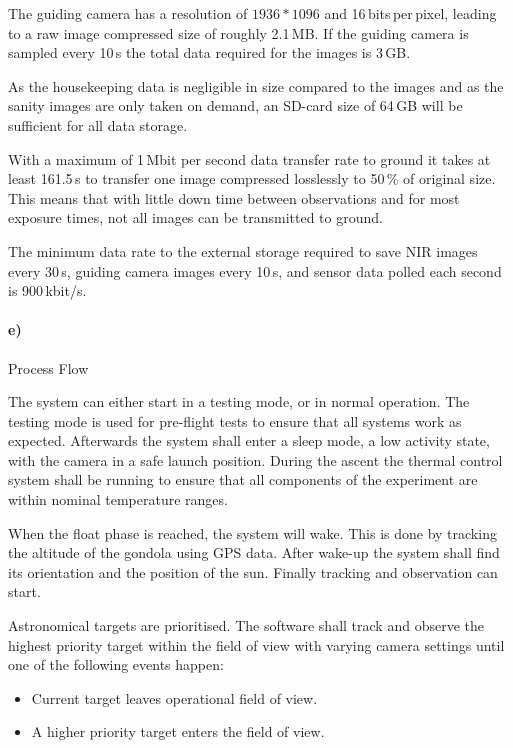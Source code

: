 The guiding camera has a resolution of $1936 * 1096$ and 16\,bits\,per\,pixel, leading to a raw image compressed size of roughly 2.1\,MB. If the guiding camera is sampled every 10\,s the total data required for the images is 3\,GB.

As the housekeeping data is negligible in size compared to the images and as the sanity images are only taken on demand, an SD-card size of 64\,GB will be sufficient for all data storage.

With a maximum of 1\,Mbit per second data transfer rate to ground it takes at least 161.5\,s to transfer one image compressed losslessly to 50\,\% of original size. This means that with little down time between observations and for most exposure times, not all images can be transmitted to ground.

The minimum data rate to the external storage required to save NIR images every 30\,s, guiding camera images every 10\,s, and sensor data polled each second is 900\,kbit/s.


\paragraph{e)} Process Flow

The system can either start in a testing mode, or in normal operation. The testing mode is used for pre-flight tests to ensure that all systems work as expected. Afterwards the system shall enter a sleep mode, a low activity state, with the camera in a safe launch position. During the ascent the thermal control system shall be running to ensure that all components of the experiment are within nominal temperature ranges.

When the float phase is reached, the system will wake. This is done by tracking the altitude of the gondola using GPS data. After wake-up the system shall find its orientation and the position of the sun. Finally tracking and observation can start.

Astronomical targets are prioritised. The software shall track and observe the highest priority target within the field of view with varying camera settings until one of the following events happen:

\begin{itemize}
	\item Current target leaves operational field of view.
	\item A higher priority target enters the field of view.
\end{itemize}

